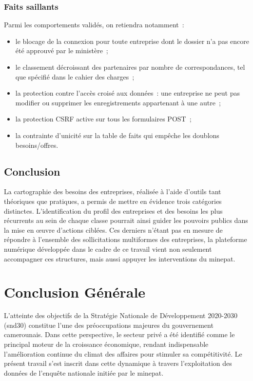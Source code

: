 \documentclass[12pt, a4paper, oneside]{report}
\begin{document}
\subsection{Faits saillants}
Parmi les comportements validés, on retiendra notamment~:
\begin{itemize}
	\item le blocage de la connexion pour toute entreprise dont le dossier
	n'a pas encore été approuvé par le ministère~;
	\item le classement décroissant des partenaires par nombre de
	correspondances, tel que spécifié dans le cahier des charges~;
	\item la protection contre l'accès croisé aux données~: une entreprise
	ne peut pas modifier ou supprimer les enregistrements
	appartenant à une autre~;
	\item la protection CSRF active sur tous les formulaires POST~;
	\item la contrainte d'unicité sur la table de faits qui empêche
	les doublons besoins/offres.
\end{itemize}
\section*{Conclusion}
La cartographie des besoins des entreprises, réalisée à l'aide d'outils tant théoriques que pratiques, a permis de mettre en évidence trois catégories distinctes. L'identification du profil des entreprises et des besoins les plus récurrents au sein de chaque classe pourrait ainsi guider les pouvoirs publics dans la mise en œuvre d'actions ciblées. Ces derniers n'étant pas en mesure de répondre à l'ensemble des sollicitations multiformes des entreprises, la plateforme numérique développée dans le cadre de ce travail vient non seulement accompagner ces structures, mais aussi appuyer les interventions du \gls{minepat}. 
	\chapter*{Conclusion Générale}
	
L'atteinte des objectifs de la Stratégie Nationale de Développement 2020-2030 (\gls{snd30}) constitue l'une des préoccupations majeures du gouvernement camerounais. Dans cette perspective, le secteur privé a été identifié comme le principal moteur de la croissance économique, rendant indispensable l'amélioration continue du climat des affaires pour stimuler sa compétitivité. Le présent travail s'est inscrit dans cette dynamique à travers l'exploitation des données de l'enquête nationale initiée par le \gls{minepat}.
\end{document}
